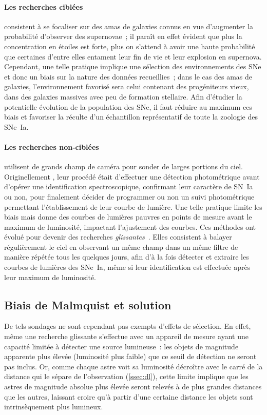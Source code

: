 \documentclass[../main/main.tex]{subfiles}
\begin{document}
\paragraph*{Les recherches ciblées} consistent à se focaliser sur des amas de
galaxies connus en vue d'augmenter la probabilité d'observer des supernovae~; il
paraît en effet évident que plus la concentration en étoiles est forte, plus on
s'attend à avoir une haute probabilité que certaines d'entre elles entament leur
fin de vie et leur explosion en supernova. Cependant, une telle pratique
implique une sélection des environnements des SNe et donc un biais sur la nature
des données recueillies~; dans le cas des amas de galaxies, l'environnement
favorisé sera celui contenant des progéniteurs vieux, dans des galaxies massives
avec peu de formation stellaire. Afin d'étudier la potentielle évolution de la
population des SNe, il faut réduire au maximum ces biais et favoriser la réculte
d'un échantillon représentatif de toute la zoologie des SNe~Ia.

\paragraph*{Les recherches non-ciblées} utilisent de grands champ de caméra pour
sonder de larges portions du ciel. Originellement
\citep[SCP,][]{perlmutter1999}, leur procédé était d'effectuer une
détection photométrique avant d'opérer une identification spectroscopique,
confirmant leur caractère de SN~Ia ou non, pour finalement décider de programmer
ou non un suivi photométrique permettant l'établissement de leur courbe de
lumière. Une telle pratique limite les biais mais donne des courbes de lumières
pauvres en points de mesure avant le maximum de luminosité, impactant
l'ajustement des courbes. Ces méthodes ont évolué pour devenir des recherches
\textit{glissantes}~\citep{astier2006}. Elles consistent à balayer régulièrement
le ciel en observant un même champ dans un même filtre de manière répétée tous
les quelques jours, afin d'à la fois détecter et extraire les courbes de
lumières des SNe~Ia, même si leur identification est effectuée après leur
maximum de luminosité.

\subsection{Biais de Malmquist et solution}\label{ssec:malm}

De tels sondages ne sont cependant pas exempts d'effets de sélection. En effet,
même une recherche glissante s'effectue avec un appareil de mesure ayant une
capacité limitée à détecter une source lumineuse~: les objets de magnitude
apparente plus élevée (luminosité plus faible) que ce seuil de détection ne
seront pas inclus. Or, comme chaque astre voit sa luminosité décroître avec le
carré de la distance qui le sépare de l'observation (\ref{ssec:dl}), cette
limite implique que les astres de magnitude absolue plus élevée seront relevés à
de plus grandes distances que les autres, laissant croire qu'à partir d'une
certaine distance les objets sont intrinsèquement plus lumineux.
\end{document}
